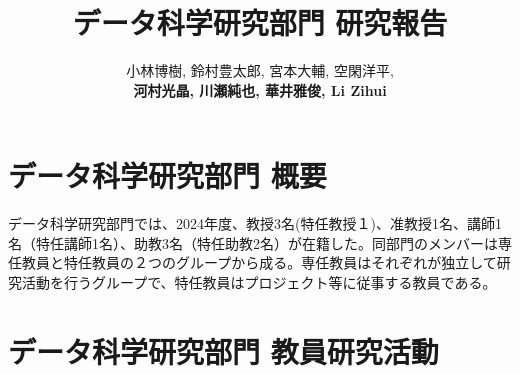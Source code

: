 \documentclass[11pt]{jarticle}
\title{データ科学研究部門 研究報告}
\author{小林博樹, 鈴村豊太郎, 宮本大輔, 空閑洋平,\\
\textbf{河村光晶, 川瀬純也, 華井雅俊, Li Zihui}}
\begin{document}
\maketitle

\section{データ科学研究部門 概要}
データ科学研究部門では、2024年度、教授3名(特任教授１)、准教授1名、講師1名（特任講師1名）、助教3名（特任助教2名）が在籍した。同部門のメンバーは専任教員と特任教員の２つのグループから成る。専任教員はそれぞれが独立して研究活動を行うグループで、特任教員はプロジェクト等に従事する教員である。

%

\section{データ科学研究部門 教員研究活動}


%


%

%
%
\end{document}
